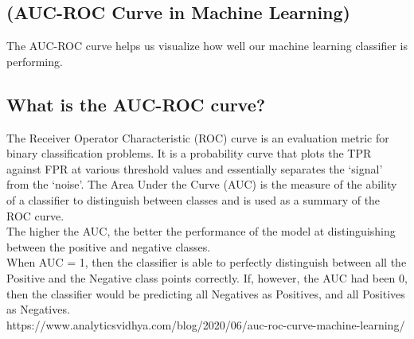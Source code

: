 \begin{appendices}
\chapter{\label{appendix}(AUC-ROC Curve in Machine Learning)}
The AUC-ROC curve helps us visualize how well our machine learning classifier is performing.
\section{What is the AUC-ROC curve?}
The Receiver Operator Characteristic (ROC) curve is an evaluation metric for binary classification problems. It is a probability curve that plots the TPR against FPR at various threshold values and essentially separates the ‘signal’ from the ‘noise’. The Area Under the Curve (AUC) is the measure of the ability of a classifier to distinguish between classes and is used as a summary of the ROC curve.\\
The higher the AUC, the better the performance of the model at distinguishing between the positive and negative classes.\\
When AUC = 1, then the classifier is able to perfectly distinguish between all the Positive and the Negative class points correctly. If, however, the AUC had been 0, then the classifier would be predicting all Negatives as Positives, and all Positives as Negatives.\\
https://www.analyticsvidhya.com/blog/2020/06/auc-roc-curve-machine-learning/
\end{appendices}


\setcounter{equation}{0}
\setcounter{table}{0}
\setcounter{figure}{0}


    



